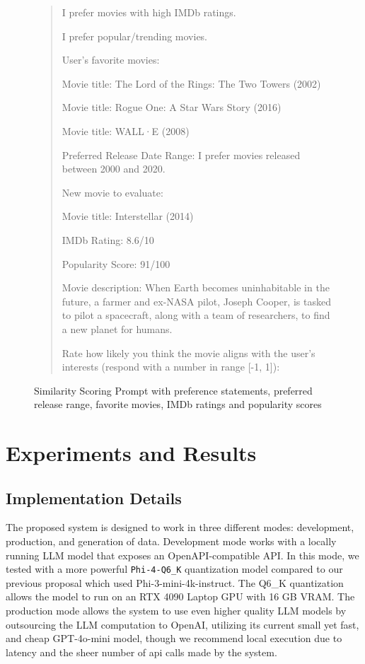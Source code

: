 \documentclass[sigconf]{acmart}
\begin{document}
\begin{figure*}
\begin{mdframed}[linewidth=1pt]
\begin{quote}
I prefer movies with high IMDb ratings.

I prefer popular/trending movies.

User's favorite movies:

Movie title: The Lord of the Rings: The Two Towers (2002)

Movie title: Rogue One: A Star Wars Story (2016)

Movie title: WALL·E (2008)

Preferred Release Date Range: I prefer movies released between 2000 and 2020.

New movie to evaluate:

Movie title: Interstellar (2014)

IMDb Rating: 8.6/10

Popularity Score: 91/100

Movie description: When Earth becomes uninhabitable in the future, a farmer and ex-NASA pilot, Joseph Cooper, is tasked to pilot a spacecraft, along with a team of researchers, to find a new planet for humans.

Rate how likely you think the movie aligns with the user's interests (respond with a number in range [-1, 1]):

\end{quote} 
\end{mdframed} 
\caption{Similarity Scoring Prompt with preference statements, preferred release range, favorite movies, IMDb ratings and popularity scores} 
\label{fig:Sim_Scoring_Prompt}
\end{figure*}

\section{Experiments and Results}
\subsection{Implementation Details}
The proposed system is designed to work in three different modes: development, production, and generation of data. Development mode works with a locally running LLM model that exposes an OpenAPI-compatible API. In this mode, we tested with a more powerful \verb|Phi-4-Q6_K| quantization model compared to our previous proposal which used Phi-3-mini-4k-instruct. The Q6\_K quantization allows the model to run on an RTX 4090 Laptop GPU with 16 GB VRAM. The production mode allows the system to use even higher quality LLM models by outsourcing the LLM computation to OpenAI, utilizing its current small yet fast, and cheap GPT-4o-mini model, though we recommend local execution due to latency and the sheer number of api calls made by the system.
\end{document}
